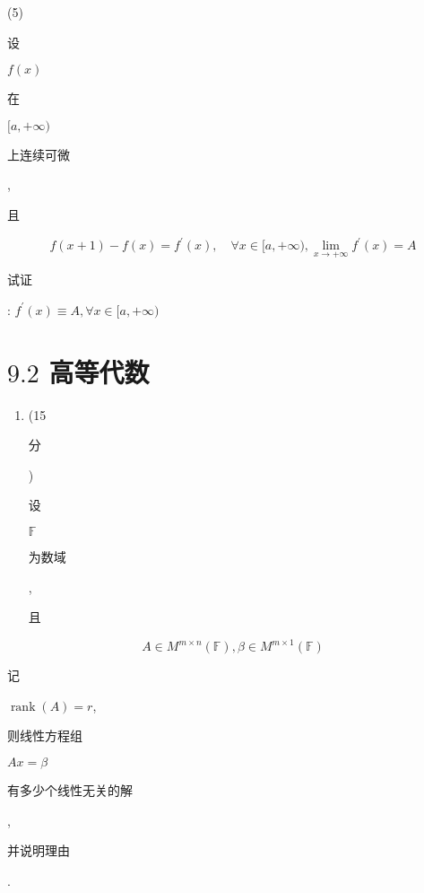 \documentclass[10pt]{article}
\begin{document}
(5) \begin{CJK}{UTF8}{mj}设\end{CJK} $f(x)$ \begin{CJK}{UTF8}{mj}在\end{CJK} $[a,+\infty)$ \begin{CJK}{UTF8}{mj}上连续可微\end{CJK}, \begin{CJK}{UTF8}{mj}且\end{CJK}
$$
f(x+1)-f(x)=f^{\prime}(x), \quad \forall x \in[a,+\infty), \lim _{x \rightarrow+\infty} f^{\prime}(x)=A
$$
\begin{CJK}{UTF8}{mj}试证\end{CJK}: $f^{\prime}(x) \equiv A, \forall x \in[a,+\infty)$

\section{$9.2$ 高等代数}
\begin{enumerate}
  \item (15 \begin{CJK}{UTF8}{mj}分\end{CJK}) \begin{CJK}{UTF8}{mj}设\end{CJK} $\mathbb{F}$ \begin{CJK}{UTF8}{mj}为数域\end{CJK}, \begin{CJK}{UTF8}{mj}且\end{CJK}
\end{enumerate}
$$
A \in M^{m \times n}(\mathbb{F}), \beta \in M^{m \times 1}(\mathbb{F})
$$
\begin{CJK}{UTF8}{mj}记\end{CJK} $\operatorname{rank}(A)=r$, \begin{CJK}{UTF8}{mj}则线性方程组\end{CJK} $A x=\beta$ \begin{CJK}{UTF8}{mj}有多少个线性无关的解\end{CJK}, \begin{CJK}{UTF8}{mj}并说明理由\end{CJK}.
\end{document}
